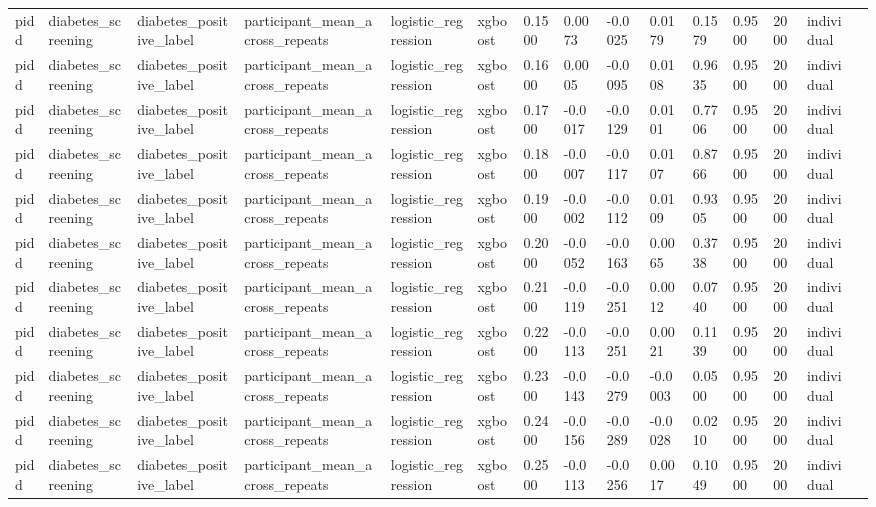 \begin{tabular}{lllllllllllllll}
pidd & diabetes\_screening & diabetes\_positive\_label & participant\_mean\_across\_repeats & logistic\_regression & xgboost & 0.1500 & 0.0073 & -0.0025 & 0.0179 & 0.1579 & 0.9500 & 2000 & individual &  \\
pidd & diabetes\_screening & diabetes\_positive\_label & participant\_mean\_across\_repeats & logistic\_regression & xgboost & 0.1600 & 0.0005 & -0.0095 & 0.0108 & 0.9635 & 0.9500 & 2000 & individual &  \\
pidd & diabetes\_screening & diabetes\_positive\_label & participant\_mean\_across\_repeats & logistic\_regression & xgboost & 0.1700 & -0.0017 & -0.0129 & 0.0101 & 0.7706 & 0.9500 & 2000 & individual &  \\
pidd & diabetes\_screening & diabetes\_positive\_label & participant\_mean\_across\_repeats & logistic\_regression & xgboost & 0.1800 & -0.0007 & -0.0117 & 0.0107 & 0.8766 & 0.9500 & 2000 & individual &  \\
pidd & diabetes\_screening & diabetes\_positive\_label & participant\_mean\_across\_repeats & logistic\_regression & xgboost & 0.1900 & -0.0002 & -0.0112 & 0.0109 & 0.9305 & 0.9500 & 2000 & individual &  \\
pidd & diabetes\_screening & diabetes\_positive\_label & participant\_mean\_across\_repeats & logistic\_regression & xgboost & 0.2000 & -0.0052 & -0.0163 & 0.0065 & 0.3738 & 0.9500 & 2000 & individual &  \\
pidd & diabetes\_screening & diabetes\_positive\_label & participant\_mean\_across\_repeats & logistic\_regression & xgboost & 0.2100 & -0.0119 & -0.0251 & 0.0012 & 0.0740 & 0.9500 & 2000 & individual &  \\
pidd & diabetes\_screening & diabetes\_positive\_label & participant\_mean\_across\_repeats & logistic\_regression & xgboost & 0.2200 & -0.0113 & -0.0251 & 0.0021 & 0.1139 & 0.9500 & 2000 & individual &  \\
pidd & diabetes\_screening & diabetes\_positive\_label & participant\_mean\_across\_repeats & logistic\_regression & xgboost & 0.2300 & -0.0143 & -0.0279 & -0.0003 & 0.0500 & 0.9500 & 2000 & individual &  \\
pidd & diabetes\_screening & diabetes\_positive\_label & participant\_mean\_across\_repeats & logistic\_regression & xgboost & 0.2400 & -0.0156 & -0.0289 & -0.0028 & 0.0210 & 0.9500 & 2000 & individual &  \\
pidd & diabetes\_screening & diabetes\_positive\_label & participant\_mean\_across\_repeats & logistic\_regression & xgboost & 0.2500 & -0.0113 & -0.0256 & 0.0017 & 0.1049 & 0.9500 & 2000 & individual &  \\

\end{tabular}
